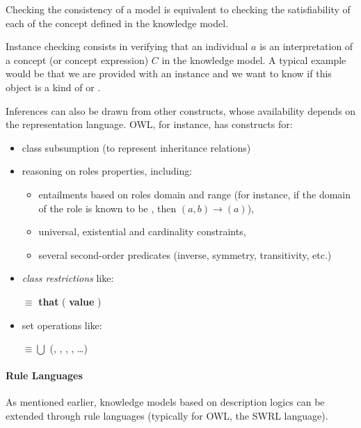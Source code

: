 Checking the consistency of a model is equivalent to checking the
satisfiability of each of the concept defined in the knowledge model.

Instance checking consists in verifying that an individual $a$ is an
interpretation of a concept (or concept expression) $C$ in the knowledge model.
A typical example would be that we are provided with an instance
 and we want to know if this object is a kind of
 or .

Inferences can also be drawn from other constructs, whose availability depends
on the representation language. OWL, for instance, has constructs for:

\begin{itemize}
    \item class subsumption (to represent inheritance relations)

    \item reasoning on roles properties, including:
        \begin{itemize}
        \item entailments based on roles domain and range (for instance, if the
        domain of the role  is known to be
        , then $(a, b) \to
        $$(a)$),

        \item universal, existential and cardinality constraints,

        \item several second-order predicates (inverse, symmetry, transitivity, etc.)

        \end{itemize}

    \item \emph{class restrictions} like: \par 
    \footnotesize 
     $\equiv$  {\bf that} (
    {\bf value} )
    \normalsize

    \item set operations like: \par 
    \footnotesize 
     $\equiv \bigcup$ (, ,
    , , \ldots) 
    \normalsize

\end{itemize}

\paragraph{Rule Languages} As mentioned earlier, knowledge models based on
description logics can be extended through rule languages (typically for OWL,
the SWRL language).

